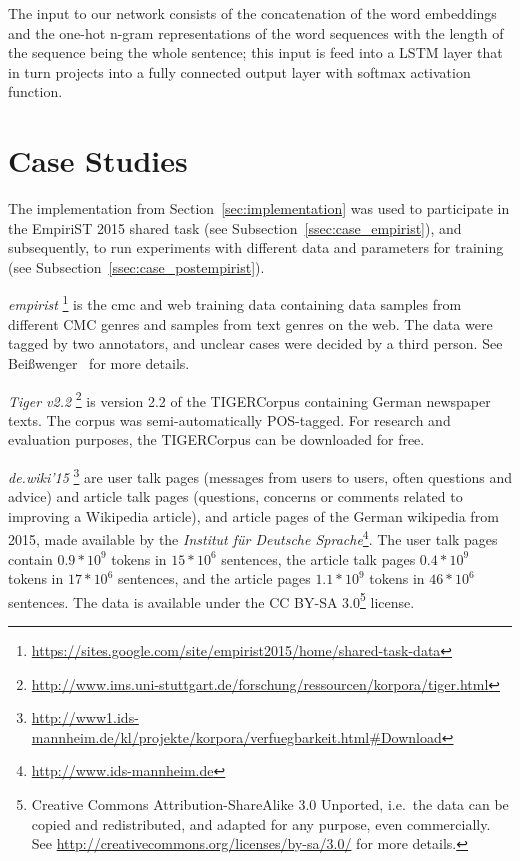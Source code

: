 \documentclass[11pt]{article}
\begin{document}
The input to our network consists of the concatenation of the word embeddings
and the one-hot n-gram representations of the word sequences with the length of
the sequence being the whole sentence; this input is feed into a LSTM layer
that in turn projects into a fully connected output layer with softmax
activation function. 

\section{Case Studies}
\label{sec:casestudies}

The implementation from Section~\ref{sec:implementation} was used to
participate in the EmpiriST 2015 shared task (see
Subsection~\ref{ssec:case_empirist}), and subsequently, to run experiments with
different data and parameters for training (see
Subsection~\ref{ssec:case_postempirist}).

\emph{empirist}%
\footnote{\url{https://sites.google.com/site/empirist2015/home/shared-task-data}}
is the cmc and web training data containing data samples from different CMC
genres and samples from text genres on the web.
The data were tagged by two annotators, and unclear cases were decided by a
third person. See Bei{\ss}wenger~ for more details.

\emph{Tiger v2.2}%
\footnote{\url{http://www.ims.uni-stuttgart.de/forschung/ressourcen/korpora/tiger.html}}
is version 2.2 of the TIGERCorpus\cite{Brants2004} containing German newspaper
texts. 
The corpus was semi-automatically POS-tagged. For research and evaluation
purposes, the TIGERCorpus can be downloaded for free.

\emph{de.wiki'15}%
\footnote{\url{http://www1.ids-mannheim.de/kl/projekte/korpora/verfuegbarkeit.html#Download}}
are user talk pages (messages from users to users, often questions and advice)
and article talk pages (questions, concerns or comments related to improving a
Wikipedia article), and article pages of the German wikipedia from 2015, made
available by the \emph{Institut f\"{u}r Deutsche
Sprache}\footnote{\url{http://www.ids-mannheim.de}}.
The user talk pages contain
$0.9*10^9$ tokens in
$15*10^6$ sentences, the article talk pages
$0.4*10^9$ tokens in
$17*10^6$ sentences, and the article pages
$1.1*10^9$
tokens in
$46*10^6$ sentences.
The data is available under the CC BY-SA 3.0\footnote{Creative Commons
Attribution-ShareAlike 3.0 Unported, i.e.~the data can be copied and
redistributed, and adapted for any purpose, even commercially. See
\url{http://creativecommons.org/licenses/by-sa/3.0/} for more details.}
license.
\end{document}

